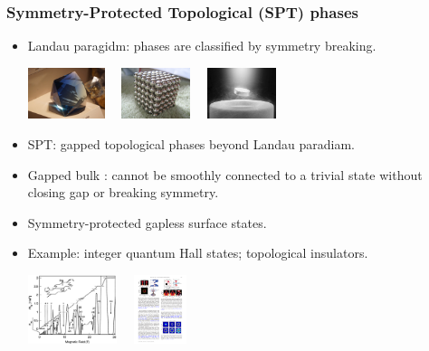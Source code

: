 \documentclass[xcolor=table, 11pt, aspectratio=169]{beamer}
\begin{document}
\begin{frame}
  \frametitle{Symmetry-Protected Topological (SPT) phases}
  \begin{itemize}
  \item Landau paragidm: phases are classified by symmetry breaking.
    \begin{center}
      \includegraphics[height=1.5cm]{../resources/crystal}~~
      \includegraphics[height=1.5cm]{../resources/magnet}~~
      \includegraphics[height=1.5cm]{../resources/sc}
    \end{center}
  \item SPT: gapped topological phases beyond Landau paradiam.
  \item Gapped bulk : cannot be smoothly connected to a trivial state without closing gap or breaking symmetry.
  \item Symmetry-protected gapless surface states.
  \item Example: integer quantum Hall states; topological insulators.
    \begin{center}
      \includegraphics[height=2cm]{../resources/fqhe}~~
      \includegraphics[height=2cm]{../spspt/ti_surface}
    \end{center}
  \end{itemize}
\end{frame}
\end{document}
